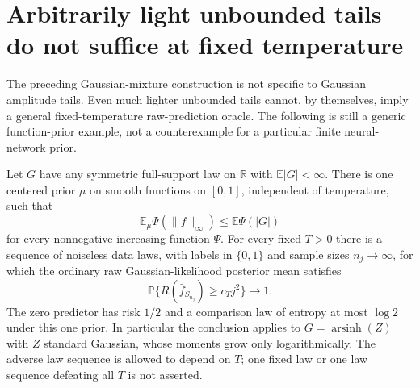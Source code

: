 \section{Arbitrarily light unbounded tails do not suffice at fixed temperature}
\label{sec:general-amplitude-obstruction}
The preceding Gaussian-mixture construction is not specific to Gaussian
amplitude tails. Even much lighter unbounded tails cannot, by themselves,
imply a general fixed-temperature raw-prediction oracle. The following
is still a generic function-prior example, not a counterexample for a
particular finite neural-network prior.

\begin{theorem}
\label{thm:general-amplitude-obstruction}
Let $G$ have any symmetric full-support law on $\mathbb R$ with
$\mathbb E|G|<\infty$. There is one centered prior $\mu$ on smooth
functions on $[0,1]$, independent of temperature, such that
\[
 \mathbb E_\mu\Psi(\|f\|_\infty)
       \le\mathbb E\Psi(|G|)
\]
for every nonnegative increasing function $\Psi$.
For every fixed $T>0$ there is a sequence of noiseless data laws,
with labels in $\{0,1\}$ and sample sizes $n_j\to\infty$, for which
the ordinary raw Gaussian-likelihood posterior mean satisfies
\[
 \mathbb P\{R(\bar f_{S_{n_j}})\ge c_Tj^2\}\longrightarrow1.
\]
The zero predictor has risk $1/2$ and a comparison law of entropy
at most $\log2$ under this one prior. In particular the conclusion applies to
$G=\operatorname{arsinh}(Z)$ with $Z$ standard Gaussian, whose moments
grow only logarithmically. The adverse law sequence is allowed to
depend on $T$; one fixed law or one law sequence defeating all
$T$ is not asserted.
\end{theorem}
